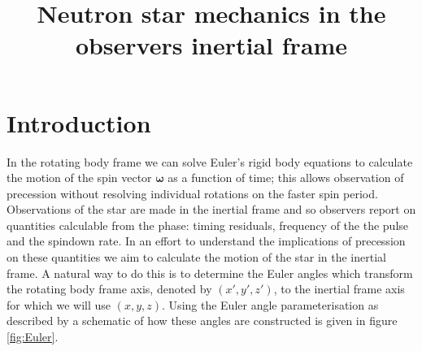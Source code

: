 \documentclass[11pt]{article}
\numberwithin{equation}{section}
\numberwithin{figure}{section}
\numberwithin{table}{section}
\begin{document}
\newcommand{\spin}{\boldsymbol{\omega}}
\newcommand{\m}{\hat{\boldsymbol{m}}}
\newcommand{\J}{\boldsymbol{J}}
\newcommand{\n}{\hat{\boldsymbol{n}}}
\newcommand{\V}{\boldsymbol{v}}

\title{Neutron star mechanics in the observers inertial frame}
\author{}
\maketitle
\section{Introduction}

In the rotating body frame we can solve Euler's rigid body equations to
calculate the motion of the spin vector $\spin$ as a function of time; this
allows observation of precession without resolving individual rotations on the
faster spin period. Observations of the star are made in the inertial frame and
so observers report on quantities calculable from the phase: timing residuals,
frequency of the the pulse and the spindown rate. In an effort to understand
the implications of precession on these quantities we aim to calculate the
motion of the star in the inertial frame.  A natural way to do this  is to
determine the Euler angles which transform the rotating body frame axis,
denoted by $(x',y', z')$, to the inertial frame axis for which we will use $(x,
y, z)$. Using the Euler angle parameterisation as described by
\citet{Landau1969} a schematic of how these angles are constructed is given in
figure \ref{fig:Euler}. 
\end{document}
